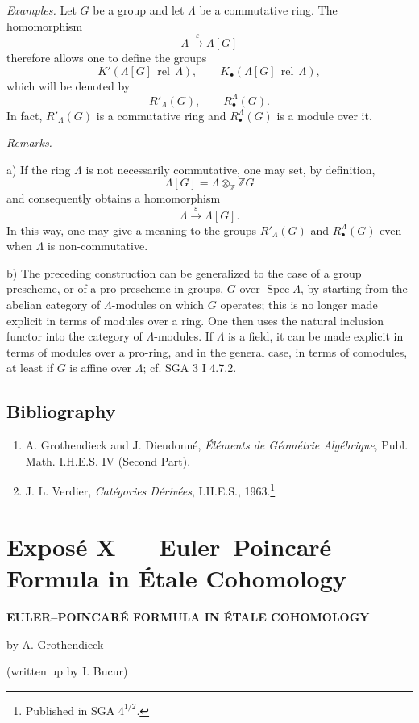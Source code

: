 \documentclass[11pt]{article}
\DeclareMathOperator{\Spec}{Spec}
\providecommand{\Spec}{\operatorname{Spec}}
\providecommand{\Spec}{\operatorname{Spec}}
\providecommand{\Spec}{\operatorname{Spec}}
\begin{document}
\emph{Examples.} Let $G$ be a group and let $\Lambda$ be a commutative ring. The homomorphism
\[
\Lambda\xrightarrow{\varepsilon}\Lambda[G]
\]
therefore allows one to define the groups
\[
K'(\Lambda[G]\operatorname{\,rel\,}\Lambda),\qquad
K_\bullet(\Lambda[G]\operatorname{\,rel\,}\Lambda),
\]
which will be denoted by
\[
R'_\Lambda(G),\qquad R^\Lambda_\bullet(G).
\]
In fact, $R'_\Lambda(G)$ is a commutative ring and $R^\Lambda_\bullet(G)$ is a module over it.

\emph{Remarks.}

a) If the ring $\Lambda$ is not necessarily commutative, one may set, by definition,
\[
\Lambda[G]=\Lambda\otimes_{\mathbb Z}\mathbb ZG
\]
and consequently obtains a homomorphism
\[
\Lambda\xrightarrow{\varepsilon}\Lambda[G].
\]
In this way, one may give a meaning to the groups $R'_\Lambda(G)$ and $R^\Lambda_\bullet(G)$ even when $\Lambda$ is non-commutative.

b) The preceding construction can be generalized to the case of a group prescheme, or of a pro-prescheme in groups, $G$ over $\Spec\Lambda$, by starting from the abelian category of $\Lambda$-modules on which $G$ operates; this is no longer made explicit in terms of modules over a ring. One then uses the natural inclusion functor into the category of $\Lambda$-modules. If $\Lambda$ is a field, it can be made explicit in terms of modules over a pro-ring, and in the general case, in terms of comodules, at least if $G$ is affine over $\Lambda$; cf. SGA 3 I 4.7.2.

\subsection*{Bibliography}

\begin{enumerate}
\item[{[1]}] A. Grothendieck and J. Dieudonné, \emph{Éléments de Géométrie Algébrique}, Publ. Math. I.H.E.S. IV (Second Part).
\item[{[2]}] J. L. Verdier, \emph{Catégories Dérivées}, I.H.E.S., 1963.\footnote{Published in SGA $4^{1/2}$.}
\end{enumerate}

\section*{Exposé X --- Euler--Poincaré Formula in Étale Cohomology}

\begin{center}
\textbf{EULER--POINCARÉ FORMULA IN ÉTALE COHOMOLOGY}

by A. Grothendieck

(written up by I. Bucur)
\end{center}
\end{document}
